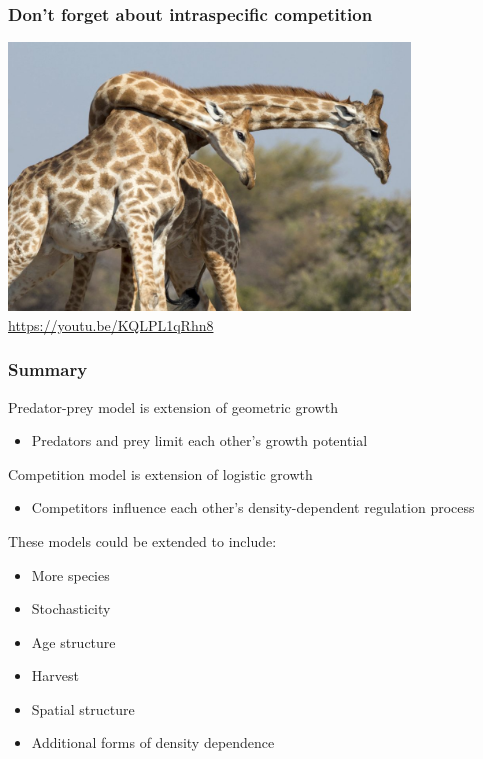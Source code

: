 \documentclass[color=usenames,dvipsnames]{beamer}\usepackage[]{graphicx}\usepackage[]{color}
\begin{document}
\begin{frame}
  \frametitle{Don't forget about intraspecific competition}
  \centering 
  \includegraphics[width=0.8\textwidth]{figs/giraffe} \\
  \url{
    https://youtu.be/KQLPL1qRhn8
  }
\end{frame}


\begin{frame}
  \frametitle{Summary}
  \large
  Predator-prey model is extension of geometric growth
    \begin{itemize}
      \item Predators and prey limit each other's growth potential
    \end{itemize}
    \pause \vfill
    Competition model is extension of logistic growth
    \begin{itemize}
      \item Competitors influence each other's density-dependent
        regulation process
    \end{itemize}
    \pause \vfill
    These models could be extended to include:
    \begin{itemize}%
    \item More species
    \item Stochasticity
    \item Age structure
    \item Harvest
    \item Spatial structure
    \item Additional forms of density dependence
    \end{itemize}
\end{frame}
\end{document}
